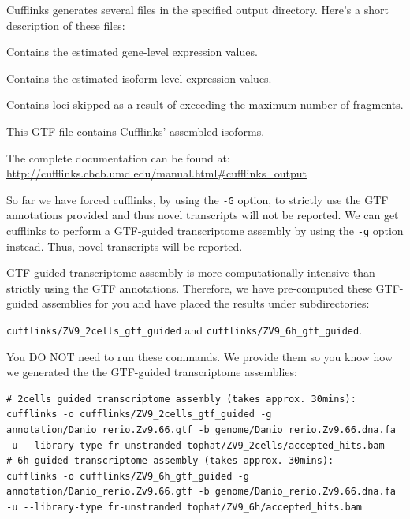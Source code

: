 \begin{information}
Cufflinks generates several files in the specified output directory. Here's a short description of these files:

\begin{description}[style=multiline,labelindent=0cm,align=right,leftmargin=\descriptionlabelspace,rightmargin=1.5cm,font=\ttfamily]
\item[genes.fpkm\_tracking] Contains the estimated gene-level expression values.
\item[isoforms.fpkm\_tracking] Contains the estimated isoform-level expression values.
\item[skipped.gtf] Contains loci skipped as a result of exceeding the maximum number of fragments.
\item[transcripts.gtf] This GTF file contains Cufflinks' assembled isoforms.
\end{description}

The complete documentation can be found at:
\url{http://cufflinks.cbcb.umd.edu/manual.html#cufflinks_output}
\end{information}

\begin{information}
So far we have forced cufflinks, by using the \texttt{-G} option, to strictly
use the GTF annotations provided and thus novel transcripts will not be reported. We
can get cufflinks to perform a GTF-guided transcriptome assembly by using the
\texttt{-g} option instead. Thus, novel transcripts will be reported.

\end{information}

\begin{warning}
GTF-guided transcriptome assembly is more computationally intensive than
strictly using the GTF annotations. Therefore, we have pre-computed these
GTF-guided assemblies for you and have placed the results under subdirectories:

\texttt{cufflinks/ZV9\_2cells\_gtf\_guided} and
\texttt{cufflinks/ZV9\_6h\_gft\_guided}.

You DO NOT need to run these commands. We provide them so you know how we
generated the the GTF-guided transcriptome assemblies:
\begin{lstlisting}
# 2cells guided transcriptome assembly (takes approx. 30mins):
cufflinks -o cufflinks/ZV9_2cells_gtf_guided -g annotation/Danio_rerio.Zv9.66.gtf -b genome/Danio_rerio.Zv9.66.dna.fa -u --library-type fr-unstranded tophat/ZV9_2cells/accepted_hits.bam
# 6h guided transcriptome assembly (takes approx. 30mins):
cufflinks -o cufflinks/ZV9_6h_gtf_guided -g annotation/Danio_rerio.Zv9.66.gtf -b genome/Danio_rerio.Zv9.66.dna.fa -u --library-type fr-unstranded tophat/ZV9_6h/accepted_hits.bam
\end{lstlisting}

\end{warning}

